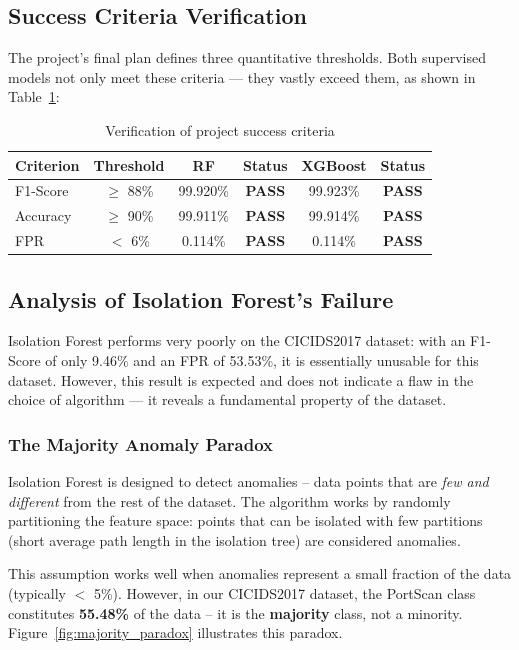 \documentclass[12pt,a4paper]{report}
\begin{document}
\subsection{Success Criteria Verification}

The project's final plan defines three quantitative thresholds. Both supervised models not only meet these criteria --- they vastly exceed them, as shown in Table~\ref{tab:success}:

\begin{table}[H]
\centering
\caption{Verification of project success criteria}
\label{tab:success}
\begin{tabular}{lccccc}
\toprule
\textbf{Criterion} & \textbf{Threshold} & \textbf{RF} & \textbf{Status} & \textbf{XGBoost} & \textbf{Status} \\
\midrule
F1-Score & $\geq$ 88\% & 99.920\% & \textbf{PASS} & 99.923\% & \textbf{PASS} \\
Accuracy & $\geq$ 90\% & 99.911\% & \textbf{PASS} & 99.914\% & \textbf{PASS} \\
FPR & $<$ 6\% & 0.114\% & \textbf{PASS} & 0.114\% & \textbf{PASS} \\
\bottomrule
\end{tabular}
\end{table}

\subsection{Analysis of Isolation Forest's Failure}

Isolation Forest performs very poorly on the CICIDS2017 dataset: with an F1-Score of only 9.46\% and an FPR of 53.53\%, it is essentially unusable for this dataset. However, this result is expected and does not indicate a flaw in the choice of algorithm --- it reveals a fundamental property of the dataset.

\subsubsection{The Majority Anomaly Paradox}

Isolation Forest is designed to detect anomalies -- data points that are \textit{few and different} from the rest of the dataset. The algorithm works by randomly partitioning the feature space: points that can be isolated with few partitions (short average path length in the isolation tree) are considered anomalies.

This assumption works well when anomalies represent a small fraction of the data (typically $<$ 5\%). However, in our CICIDS2017 dataset, the PortScan class constitutes \textbf{55.48\%} of the data -- it is the \textbf{majority} class, not a minority. Figure~\ref{fig:majority_paradox} illustrates this paradox.
\end{document}
